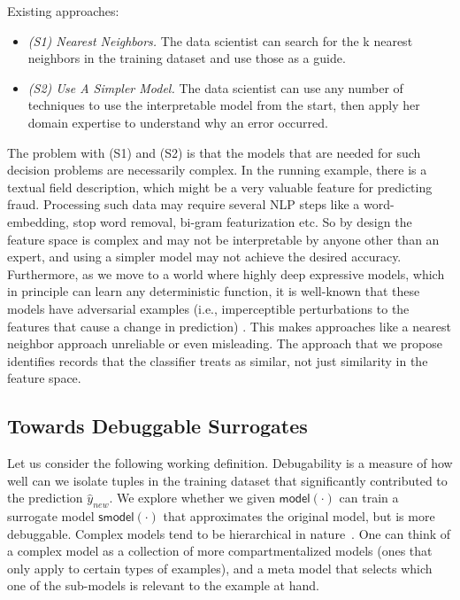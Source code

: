 Existing approaches: 
\begin{itemize}
\item \emph{(S1) Nearest Neighbors. } The data scientist can search for the k nearest neighbors in the training dataset and use those as a guide.

\item \emph{(S2) Use A Simpler Model.} The data scientist can use any number of techniques to use the interpretable model from the start\cite{?}, then apply her domain expertise to understand why an error occurred.
\end{itemize}

The problem with (S1) and (S2) is that the models that are needed for such decision problems are necessarily complex. In the running example, there is a textual field \textsf{description}, which might be a very valuable feature for predicting fraud. Processing such data may require several NLP steps like a word-embedding, stop word removal, bi-gram featurization etc. So by design the feature space is complex and may not be interpretable by anyone other than an expert, and using a simpler model may not achieve the desired accuracy. Furthermore, as we move to a world where highly deep expressive models, which in principle can learn any deterministic function, it is well-known that these models have adversarial examples (i.e., imperceptible perturbations to the features that cause a change in prediction) \cite{?}. This makes approaches like a nearest neighbor approach unreliable or even misleading. The approach that we propose identifies records that the classifier treats as similar, not just similarity in the feature space.

\subsection{Towards Debuggable Surrogates}
Let us consider the following working definition.
Debugability is a measure of how well can we isolate tuples in the training dataset that significantly contributed to the prediction $ \hat{y}_{new}$.
We explore whether we given $\textsf{model}(\cdot)$ can train a surrogate model $\textsf{smodel}(\cdot)$ that approximates the original model, but is more debuggable.
Complex models tend to be hierarchical in nature~\cite{?}.
One can think of a complex model as a collection of more compartmentalized models (ones that only apply to certain types of examples), and a meta model that selects which one of the sub-models is relevant to the example at hand.

